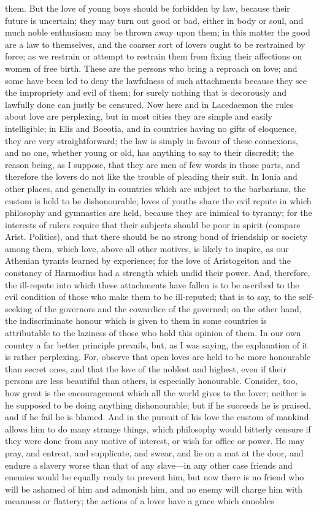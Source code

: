 \documentclass[11pt,letter]{article}
\begin{document}
them. But the love of young boys should be forbidden by law, because their future is uncertain; they may turn out good or bad, either in body or soul, and much noble enthusiasm may be thrown away upon them; in this matter the good are a law to themselves, and the coarser sort of lovers ought to be restrained by force; as we restrain or attempt to restrain them from fixing their affections on women of free birth. These are the persons who bring a reproach on love; and some have been led to deny the lawfulness of such attachments because they see the impropriety and evil of them; for surely nothing that is decorously and lawfully done can justly be censured. Now here and in Lacedaemon the rules about love are perplexing, but in most cities they are simple and easily intelligible; in Elis and Boeotia, and in countries having no gifts of eloquence, they are very straightforward; the law is simply in favour of these connexions, and no one, whether young or old, has anything to say to their discredit; the reason being, as I suppose, that they are men of few words in those parts, and therefore the lovers do not like the trouble of pleading their suit. In Ionia and other places, and generally in countries which are subject to the barbarians, the custom is held to be dishonourable; loves of youths share the evil repute in which philosophy and gymnastics are held, because they are inimical to tyranny; for the interests of rulers require that their subjects should be poor in spirit (compare Arist. Politics), and that there should be no strong bond of friendship or society among them, which love, above all other motives, is likely to inspire, as our Athenian tyrants learned by experience; for the love of Aristogeiton and the constancy of Harmodius had a strength which undid their power. And, therefore, the ill-repute into which these attachments have fallen is to be ascribed to the evil condition of those who make them to be ill-reputed; that is to say, to the self-seeking of the governors and the cowardice of the governed; on the other hand, the indiscriminate honour which is given to them in some countries is attributable to the laziness of those who hold this opinion of them. In our own country a far better principle prevails, but, as I was saying, the explanation of it is rather perplexing. For, observe that open loves are held to be more honourable than secret ones, and that the love of the noblest and highest, even if their persons are less beautiful than others, is especially honourable. Consider, too, how great is the encouragement which all the world gives to the lover; neither is he supposed to be doing anything dishonourable; but if he succeeds he is praised, and if he fail he is blamed. And in the pursuit of his love the custom of mankind allows him to do many strange things, which philosophy would bitterly censure if they were done from any motive of interest, or wish for office or power. He may pray, and entreat, and supplicate, and swear, and lie on a mat at the door, and endure a slavery worse than that of any slave—in any other case friends and enemies would be equally ready to prevent him, but now there is no friend who will be ashamed of him and admonish him, and no enemy will charge him with meanness or flattery; the actions of a lover have a grace which ennobles 
\end{document}
